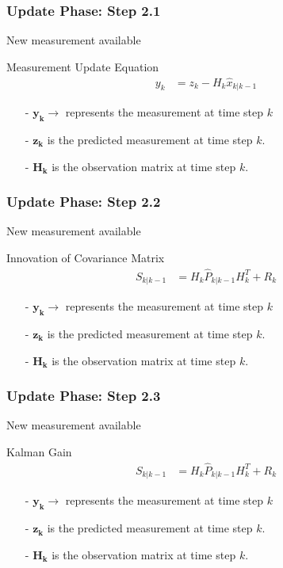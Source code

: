 \documentclass[aspectratio=169,hyperref={pdfpagelabels=false}]{beamer}
\begin{document}
\begin{frame}
  \frametitle{Update Phase: Step 2.1}
  New measurement available
  \begin{block}{Measurement Update Equation}
    \begin{align*}
      y_{k} &= z_{k} - H_{k}\hat{x}_{k|k-1}
      \end{align*}
      \begin{itemize}
        \item[-] $\mathbf{y_k} \rightarrow$ represents the measurement at time step $k$
        \item[-] $\mathbf{z_k}$ is the predicted measurement at time step $k$.
        \item[-] $\mathbf{H_k}$ is the observation matrix at time step $k$.
      \end{itemize}
  \end{block}
\end{frame}

\begin{frame}
  \frametitle{Update Phase: Step 2.2}
  New measurement available
  \begin{block}{Innovation of Covariance Matrix }
    \begin{align*}
      S_{k|k-1} &= H_{k}\hat{P}_{k|k-1}H_{k}^T + R_{k}
      \end{align*}
      \begin{itemize}
        \item[-] $\mathbf{y_k} \rightarrow$ represents the measurement at time step $k$
        \item[-] $\mathbf{z_k}$ is the predicted measurement at time step $k$.
        \item[-] $\mathbf{H_k}$ is the observation matrix at time step $k$.
      \end{itemize}
  \end{block}
\end{frame}


\begin{frame}
  \frametitle{Update Phase: Step 2.3}
  New measurement available
  \begin{block}{Kalman Gain}
    \begin{align*}
      S_{k|k-1} &= H_{k}\hat{P}_{k|k-1}H_{k}^T + R_{k}
      \end{align*}
      \begin{itemize}
        \item[-] $\mathbf{y_k} \rightarrow$ represents the measurement at time step $k$
        \item[-] $\mathbf{z_k}$ is the predicted measurement at time step $k$.
        \item[-] $\mathbf{H_k}$ is the observation matrix at time step $k$.
      \end{itemize}
  \end{block}
\end{frame}
\end{document}
